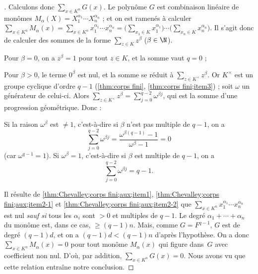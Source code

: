 \documentclass[11pt, %
  title in boldface,
  theorem in new line,
  theorem numbering = section,
  number theorems separately,
  simple name,
]{beaulivre}
\begin{document}
\begin{proof}[{Démonstration \cref[de]{thm:Chevalley;corps fini}}]
        Calculons donc \( \sum_{x \in K^n} G(x) \). Le polynôme \( G \) est combinaison linéaire de monômes \( M_{\alpha}(X) = X_1^{\alpha_1} \cdots X_n^{\alpha_n} \) ; et on est ramenés à calculer \( \sum_{x \in K^n} M_{\alpha}(x) = \sum_{x \in K^n} x_1^{\alpha_1} \cdots x_n^{\alpha_n} = \bigl(\sum_{x_1 \in K} x_1^{\alpha_1}\bigr) \cdots \bigl(\sum_{x_n \in K} x_n^{\alpha_n}\bigr) \). Il s'agit donc de calculer des sommes de la forme \( \sum_{z \in K} z^{\beta} \) (\( \beta \in \N \)).
        \begin{enumerate-alph}
            \item \label{thm:Chevalley;corps fini;aux;item1} Pour \( \beta = 0 \), on a \( z^{\beta} = 1 \) pour tout \( z \in K \), et la somme vaut \( q = 0 \) ;
            \item \label{thm:Chevalley;corps fini;aux;item2} Pour \( \beta > 0 \), le terme \( 0^{\beta} \) est nul, et la somme se réduit à \( \sum_{z \in K^\times} z^{\beta} \). Or \( K^\times \) est un groupe cyclique d'ordre \( q-1 \) (\cref{thm:corps fini}, \ref{thm:corps fini;item3}) ; soit \( \omega \) un générateur de celui-ci. Alors \( \sum_{z \in K^\times} z^{\beta} = \sum_{j=0}^{q-2} {\omega}^{\beta j} \), qui est la somme d'une progression géométrique. Donc :
            \begin{enumerate}
                 \label{thm:Chevalley;corps fini;aux;item2-1} Si la raison \( \omega^{\beta} \) est \( \neq 1 \), c'est-à-dire si \( \beta \) n'est pas multiple de \( q-1 \), on a
                \[
                    \sum_{j=0}^{q-2} {\omega}^{\beta j} = \frac{{\omega}^{\beta (q-1)}-1}{{\omega}^{\beta}-1} = 0
                \]
                (car \( \omega^{q-1} = 1 \)).
                 \label{thm:Chevalley;corps fini;aux;item2-2} Si \( \omega^{\beta} = 1 \), c'est-à-dire si \( \beta \) est multiple de \( q-1 \), on a
                \[
                    \sum_{j=0}^{q-2} {\omega}^{\beta j} = q-1.
                \]
            \end{enumerate}
        \end{enumerate-alph}
        Il résulte de \ref{thm:Chevalley;corps fini;aux;item1}, \ref{thm:Chevalley;corps fini;aux;item2-1} et \ref{thm:Chevalley;corps fini;aux;item2-2} que \( \sum_{x \in K^n} x_1^{\alpha_1} \cdots x_n^{\alpha_n} \) est nul \emph{sauf si} tous les \( \alpha_i \) sont \( > 0 \) et multiples de \( q-1 \). Le degré \( \alpha_1 + \cdots + \alpha_n \) du monôme est, dans ce cas, \( \geqslant (q-1)n \). Mais, comme \( G = F^{q-1} \), \( G \) est de degré \( (q-1)d \), et on a \( (q-1)d < (q-1)n \) d'après l'hypothèse. On a donc \( \sum_{x \in K^n} M_{\alpha}(x) = 0 \) pour tout monôme \( M_{\alpha}(x) \) qui figure dans~\( G \) avec coefficient non nul. D'où, par addition, \( \sum_{x \in K^n} G(x) = 0 \). Nous avons vu que cette relation entraîne notre conclusion.
    \end{proof}
\end{document}
